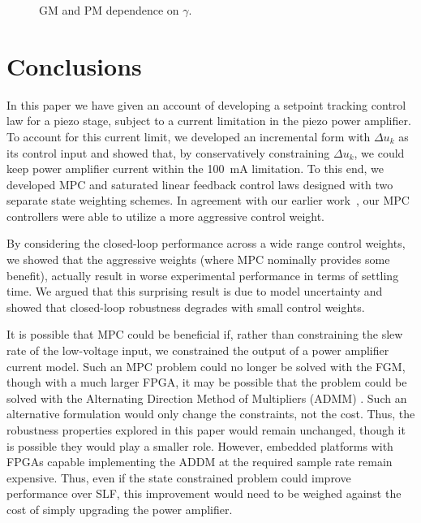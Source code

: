 \documentclass[twocolumn,twoside]{IEEEtran}
\begin{document}
\begin{figure}[ht!]
  
  \caption{GM and PM dependence on $\gamma$.}
  \label{fig:gmpm}
\end{figure}

\section{Conclusions}
In this paper we have given an account of developing a setpoint tracking control law for a piezo stage, subject to a current limitation in the piezo power amplifier. To account for this current limit, we developed an incremental form with $\Delta u_k$ as its control input and showed that, by conservatively constraining $\Delta u_k$, we could keep power amplifier current within the 100~mA limitation. To this end, we developed MPC and saturated linear feedback control laws designed with two separate state weighting schemes. In agreement with our earlier work~\cite{braker_application_2017}, our MPC controllers were able to utilize a more aggressive control weight.

By considering the closed-loop performance across a wide range control weights, we showed that the aggressive weights (where MPC nominally provides some benefit), actually result in worse experimental performance in terms of settling time. We argued that this surprising result is due to model uncertainty and showed that closed-loop robustness degrades with small control weights. 

It is possible that MPC could be beneficial if, rather than constraining the slew rate of the low-voltage input, we constrained the output of a power amplifier current model. Such an MPC problem could no longer be solved with the FGM, though with a much larger FPGA, it may be possible that the problem could be solved with the Alternating Direction Method of Multipliers (ADMM) \cite{Jerez_Trans_2014}. Such an alternative formulation would only change the constraints, not the cost. Thus, the robustness properties explored in this paper would remain unchanged, though it is possible they would play a smaller role. However, embedded platforms with FPGAs capable implementing the ADDM at the required sample rate remain expensive. Thus, even if the state constrained problem could improve performance over SLF, this improvement would need to be weighed against the cost of simply upgrading the power amplifier. 
\end{document}
